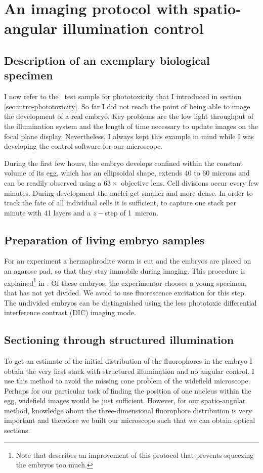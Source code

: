 \section{An imaging protocol with spatio-angular illumination control}
\subsection{Description of an exemplary biological specimen} 
I now refer to the \celegans\ test sample for phototoxicity that I
introduced in section \ref{sec:intro-phototoxicity}. So far I did not
reach the point of being able to image the development of a real
embryo. Key problems are the low light throughput of the illumination
system and the length of time necessary to update images on the focal
plane display. Nevertheless, I always kept this example in mind while
I was developing the control software for our microscope.

During the first few hours, the embryo develops confined within the
constant volume of its egg, which has an ellipsoidal shape, extends 40
to 60 microns and can be readily observed using a $63\times$ objective
lens. Cell divisions occur every few minutes.  During development the
nuclei get smaller and more dense. In order to track the fate of all
individual cells it is sufficient, to capture one stack per minute
with 41 layers and a $z-$step of 1~micron.
\subsection{Preparation of living embryo samples} 
For an experiment a hermaphrodite worm is cut and the embryos are
placed on an agarose pad, so that they stay immobile during
imaging. This procedure is explained\footnote{Note that
  \cite{Murray2006} describes an improvement of this protocol that
  prevents squeezing the embryos too much.} in \cite{Hope1999}. Of
these embryos, the experimentor chooses a young specimen, that has not
yet divided. We avoid to use fluorescence excitation for this step.
The undivided embryos can be distinguished using the less phototoxic
differential interference contrast (DIC) imaging mode.

\subsection{Sectioning through structured illumination} 
To get an estimate of the initial distribution of the fluorophores in
the embryo I obtain the very first stack with structured illumination
and no angular control. I use this method to avoid the missing cone
problem of the widefield microscope. Perhaps for our particular task
of finding the position of one nucleus within the egg, widefield
images would be just sufficient.  However, for our spatio-angular
method, knowledge about the three-dimensional fluorophore distribution is very important
and therefore we built our microscope such that we can obtain optical
sections.

